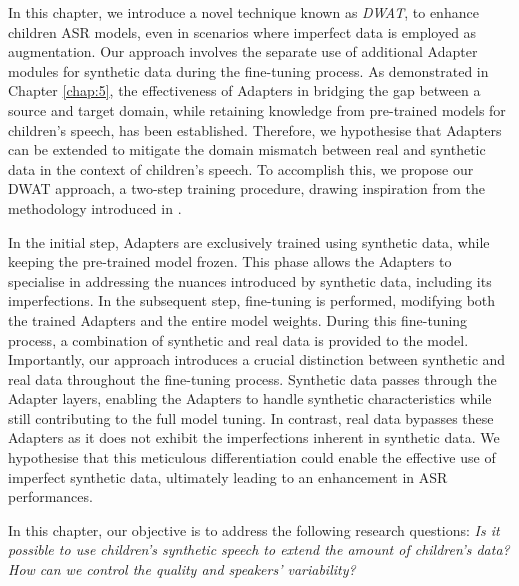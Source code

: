 In this chapter, we introduce a novel technique known as \textit{\ac{DWAT}}, to enhance children \ac{ASR} models, even in scenarios where imperfect data is employed as augmentation. Our approach involves the separate use of additional Adapter modules for synthetic data during the fine-tuning process. As demonstrated in Chapter \ref{chap:5}, the effectiveness of Adapters in bridging the gap between a source and target domain, while retaining knowledge from pre-trained models for children's speech, has been established. Therefore, we hypothesise that Adapters can be extended to mitigate the domain mismatch between real and synthetic data in the context of children's speech. To accomplish this, we propose our \ac{DWAT} approach, a two-step training procedure, drawing inspiration from the methodology introduced in \cite{fan2022draft}.


In the initial step, Adapters are exclusively trained using synthetic data, while keeping the pre-trained model frozen. This phase allows the Adapters to specialise in addressing the nuances introduced by synthetic data, including its imperfections. In the subsequent step, fine-tuning is performed, modifying both the trained Adapters and the entire model weights. During this fine-tuning process, a combination of synthetic and real data is provided to the model. Importantly, our approach introduces a crucial distinction between synthetic and real data throughout the fine-tuning process. Synthetic data passes through the Adapter layers, enabling the Adapters to handle synthetic characteristics while still contributing to the full model tuning. In contrast, real data bypasses these Adapters as it does not exhibit the imperfections inherent in synthetic data. We hypothesise that this meticulous differentiation could enable the effective use of imperfect synthetic data, ultimately leading to an enhancement in \ac{ASR} performances.


In this chapter, our objective is to address the following research questions: \textit{Is it possible to use children's synthetic speech to extend the amount of children's data? How can we control the quality and speakers’ variability?}

